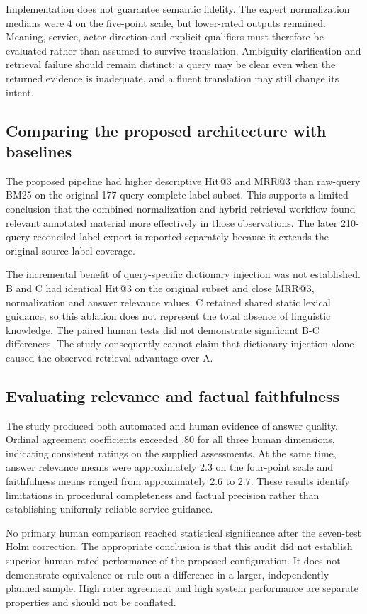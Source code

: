 Implementation does not guarantee semantic fidelity. The expert normalization medians were 4 on the five-point scale, but lower-rated outputs remained. Meaning, service, actor direction and explicit qualifiers must therefore be evaluated rather than assumed to survive translation. Ambiguity clarification and retrieval failure should remain distinct: a query may be clear even when the returned evidence is inadequate, and a fluent translation may still change its intent.


\subsection{Comparing the proposed architecture with baselines}

The proposed pipeline had higher descriptive Hit@3 and MRR@3 than raw-query BM25 on the original 177-query complete-label subset. This supports a limited conclusion that the combined normalization and hybrid retrieval workflow found relevant annotated material more effectively in those observations. The later 210-query reconciled label export is reported separately because it extends the original source-label coverage.


The incremental benefit of query-specific dictionary injection was not established. B and C had identical Hit@3 on the original subset and close MRR@3, normalization and answer relevance values. C retained shared static lexical guidance, so this ablation does not represent the total absence of linguistic knowledge. The paired human tests did not demonstrate significant B-C differences. The study consequently cannot claim that dictionary injection alone caused the observed retrieval advantage over A.


\subsection{Evaluating relevance and factual faithfulness}

The study produced both automated and human evidence of answer quality. Ordinal agreement coefficients exceeded .80 for all three human dimensions, indicating consistent ratings on the supplied assessments. At the same time, answer relevance means were approximately 2.3 on the four-point scale and faithfulness means ranged from approximately 2.6 to 2.7. These results identify limitations in procedural completeness and factual precision rather than establishing uniformly reliable service guidance.


No primary human comparison reached statistical significance after the seven-test Holm correction. The appropriate conclusion is that this audit did not establish superior human-rated performance of the proposed configuration. It does not demonstrate equivalence or rule out a difference in a larger, independently planned sample. High rater agreement and high system performance are separate properties and should not be conflated.


